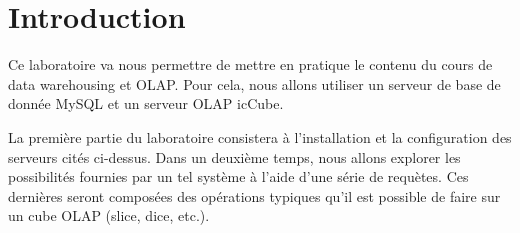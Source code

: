 \chapter*{Introduction}

Ce laboratoire va nous permettre de mettre en pratique le contenu du cours de data warehousing et OLAP. Pour cela, nous allons utiliser un serveur de base de donnée MySQL et un serveur OLAP icCube.

La première partie du laboratoire consistera à l'installation et la configuration des serveurs cités ci-dessus. Dans un deuxième temps, nous allons explorer les possibilités fournies par un tel système à l'aide d'une série de requètes. Ces dernières seront composées des opérations typiques qu'il est possible de faire sur un cube OLAP (slice, dice, etc.).

